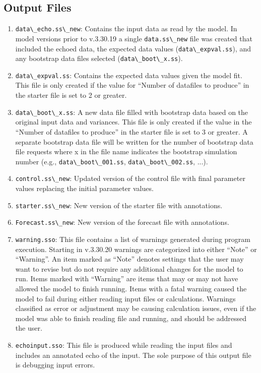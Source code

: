 \subsection{Output Files}
\begin{enumerate}
	\item \verb|data\_echo.ss\_new|: Contains the input data as read by the model. In model versions prior to v.3.30.19 a single \verb|data.ss\_new| file was created that included the echoed data, the expected data values (\verb|data\_expval.ss|), and any bootstrap data files selected (\verb|data\_boot\_x.ss|).
	\item \verb|data\_expval.ss|: Contains the expected data values given the model fit. This file is only created if the value for ``Number of datafiles to produce'' in the starter file is set to 2 or greater.
	\item \verb|data\_boot\_x.ss|: A new data file filled with bootstrap data based on the original input data and variances. This file is only created if the value in the ``Number of datafiles to produce'' in the starter file is set to 3 or greater. A separate bootstrap data file will be written for the number of bootstrap data file requests where x in the file name indicates the bootstrap simulation number (e.g., \verb|data\_boot\_001.ss|, \verb|data\_boot\_002.ss|, ...).
	\item \verb|control.ss\_new|: Updated version of the control file with final parameter values replacing the initial parameter values.
	\item \verb|starter.ss\_new|: New version of the starter file with annotations.
	\item \verb|Forecast.ss\_new|: New version of the forecast file with annotations.
	\item \verb|warning.sso|: This file contains a list of warnings generated during program execution. Starting in v.3.30.20 warnings are categorized into either ``Note'' or ``Warning''. An item marked as ``Note'' denotes settings that the user may want to revise but do not require any additional changes for the model to run. Items marked with ``Warning'' are items that may or may not have allowed the model to finish running. Items with a fatal warning caused the model to fail during either reading input files or calculations. Warnings classified as error or adjustment may be causing calculation issues, even if the model was able to finish reading file and running, and should be addressed the user. 
	\item \verb|echoinput.sso|: This file is produced while reading the input files and includes an annotated echo of the input. The sole purpose of this output file is debugging input errors.

\end{enumerate}
